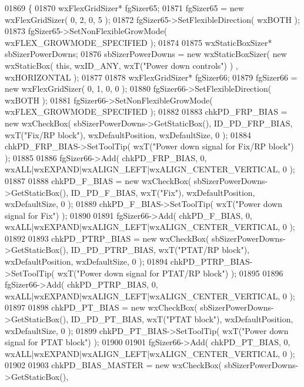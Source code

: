 \begin{DoxyCode}
01869 \{
01870     wxFlexGridSizer* fgSizer65;
01871     fgSizer65 = \textcolor{keyword}{new} wxFlexGridSizer( 0, 2, 0, 5 );
01872     fgSizer65->SetFlexibleDirection( wxBOTH );
01873     fgSizer65->SetNonFlexibleGrowMode( wxFLEX\_GROWMODE\_SPECIFIED );
01874     
01875     wxStaticBoxSizer* sbSizerPowerDowns;
01876     sbSizerPowerDowns = \textcolor{keyword}{new} wxStaticBoxSizer( \textcolor{keyword}{new} wxStaticBox( \textcolor{keyword}{this}, wxID\_ANY, wxT(\textcolor{stringliteral}{"Power down controls"}) )
      , wxHORIZONTAL );
01877     
01878     wxFlexGridSizer* fgSizer66;
01879     fgSizer66 = \textcolor{keyword}{new} wxFlexGridSizer( 0, 1, 0, 0 );
01880     fgSizer66->SetFlexibleDirection( wxBOTH );
01881     fgSizer66->SetNonFlexibleGrowMode( wxFLEX\_GROWMODE\_SPECIFIED );
01882     
01883     chkPD_FRP_BIAS = \textcolor{keyword}{new} wxCheckBox( sbSizerPowerDowns->GetStaticBox(), 
      ID_PD_FRP_BIAS, wxT(\textcolor{stringliteral}{"Fix/RP block"}), wxDefaultPosition, wxDefaultSize, 0 );
01884     chkPD_FRP_BIAS->SetToolTip( wxT(\textcolor{stringliteral}{"Power down signal for Fix/RP block"}) );
01885     
01886     fgSizer66->Add( chkPD_FRP_BIAS, 0, wxALL|wxEXPAND|wxALIGN\_LEFT|wxALIGN\_CENTER\_VERTICAL, 0 );
01887     
01888     chkPD_F_BIAS = \textcolor{keyword}{new} wxCheckBox( sbSizerPowerDowns->GetStaticBox(), 
      ID_PD_F_BIAS, wxT(\textcolor{stringliteral}{"Fix"}), wxDefaultPosition, wxDefaultSize, 0 );
01889     chkPD_F_BIAS->SetToolTip( wxT(\textcolor{stringliteral}{"Power down signal for Fix"}) );
01890     
01891     fgSizer66->Add( chkPD_F_BIAS, 0, wxALL|wxEXPAND|wxALIGN\_LEFT|wxALIGN\_CENTER\_VERTICAL, 0 );
01892     
01893     chkPD_PTRP_BIAS = \textcolor{keyword}{new} wxCheckBox( sbSizerPowerDowns->GetStaticBox(), 
      ID_PD_PTRP_BIAS, wxT(\textcolor{stringliteral}{"PTAT/RP block"}), wxDefaultPosition, wxDefaultSize, 0 );
01894     chkPD_PTRP_BIAS->SetToolTip( wxT(\textcolor{stringliteral}{"Power down signal for PTAT/RP block"}) );
01895     
01896     fgSizer66->Add( chkPD_PTRP_BIAS, 0, wxALL|wxEXPAND|wxALIGN\_LEFT|wxALIGN\_CENTER\_VERTICAL, 0 );
01897     
01898     chkPD_PT_BIAS = \textcolor{keyword}{new} wxCheckBox( sbSizerPowerDowns->GetStaticBox(), 
      ID_PD_PT_BIAS, wxT(\textcolor{stringliteral}{"PTAT block"}), wxDefaultPosition, wxDefaultSize, 0 );
01899     chkPD_PT_BIAS->SetToolTip( wxT(\textcolor{stringliteral}{"Power down signal for PTAT block"}) );
01900     
01901     fgSizer66->Add( chkPD_PT_BIAS, 0, wxALL|wxEXPAND|wxALIGN\_LEFT|wxALIGN\_CENTER\_VERTICAL, 0 );
01902     
01903     chkPD_BIAS_MASTER = \textcolor{keyword}{new} wxCheckBox( sbSizerPowerDowns->GetStaticBox(), 

\end{DoxyCode}
